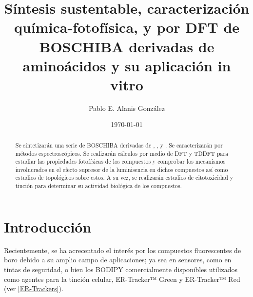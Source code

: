 \documentclass[spanish,mexico]{scrartcl}
\title{Síntesis sustentable, caracterización química-fotofísica, y por {DFT} de {BOSCHIBA} derivadas de aminoácidos y su aplicación in vitro}
\date{\today}
\author{Pablo E. Alanis González}
\begin{document}
\maketitle

\begin{abstract}
    Se sintetizarán una serie de \gls{BOSCHIBA} derivadas de , ,  y . Se caracterizarán por métodos espectroscópicos. Se realizarán cálculos \insilico{} por medio de \gls{DFT} y \gls{TDDFT} para estudiar las propiedades fotofísicas de los compuestos y comprobar los mecanismos involucrados en el efecto supresor de la luminisencia en dichos compuestos así como estudios de topológicos sobre estos. A su vez, se realizarán estudios de citotoxicidad y tinción \invitro{} para determinar su actividad biológica de los compuestos.
\end{abstract}

\tableofcontents

\section{Introducción}

Recientemente, se ha acrecentado el interés por los compuestos fluorescentes de boro debido a su amplio campo de aplicaciones; \autocite{ibarra-rodriguezOrganoboronSchiffBases2019} ya sea en sensores, como en tintas de seguridad, o bien los \gls{BODIPY} comercialmente disponibles utilizados como agentes para la tinción celular, ER-Tracker™ Green y ER-Tracker™ Red (ver \cref{ER-Trackers}).
\end{document}

